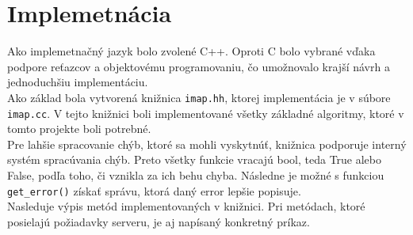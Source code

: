 \documentclass{article}
\begin{document}
\section{Implemetnácia}
Ako implemetnačný jazyk bolo zvolené C++. Oproti C bolo vybrané vďaka podpore reťazcov a objektovému programovaniu, čo umožnovalo krajší návrh a jednoduchšiu implementáciu.\\
Ako základ bola vytvorená knižnica \texttt{imap.hh}, ktorej implementácia je v súbore \texttt{imap.cc}. V tejto knižnici boli implementované všetky základné algoritmy, ktoré v tomto projekte boli potrebné.\\
Pre lahšie spracovanie chýb, ktoré sa mohli vyskytnúť, knižnica podporuje interný systém spracúvania chýb. Preto všetky funkcie vracajú bool, teda True alebo False, podľa toho, či vznikla za ich behu chyba. Následne je možné s funkciou \texttt{get\_error()} získať správu, ktorá daný error lepšie popisuje.\\
Nasleduje výpis metód implementovaných v knižnici. Pri metódach, ktoré posielajú požiadavky serveru, je aj napísaný konkretný príkaz.\\
\end{document}
